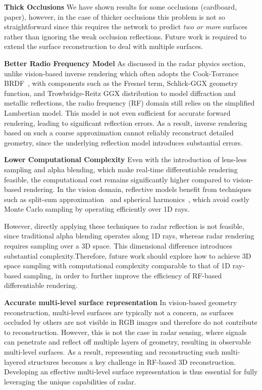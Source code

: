 \noindent \textbf{Thick Occlusions} We have shown results for some occlusions (cardboard, paper), however, in the case of thicker occlusions this problem is not so straightforward since this requires the network to predict \textit{two or more} surfaces rather than ignoring the weak occlusion reflections. Future work is required to extend the surface reconstruction to deal with multiple surfaces.

\noindent \textbf{Better Radio Frequency Model}
As discussed in the radar physics section, unlike vision-based inverse rendering which often adopts the Cook-Torrance BRDF~\cite{cook1982reflectance}, with components such as the Fresnel term, Schlick-GGX geometry function, and Trowbridge-Reitz GGX distribution to model diffraction and metallic reflections, the radio frequency (RF) domain still relies on the simplified Lambertian model.
This model is not even sufficient for accurate forward rendering, leading to significant reflection errors.
As a result, inverse rendering based on such a coarse approximation cannot reliably reconstruct detailed geometry, since the underlying reflection model introduces substantial errors.

\noindent \textbf{Lower Computational Complexity}
Even with the introduction of lens-less sampling and alpha blending, which make real-time differentiable rendering feasible, the computational cost remains significantly higher compared to vision-based rendering.
In the vision domain, reflective models benefit from techniques such as split-sum approximation~\cite{munkberg2022extracting} and spherical harmonics~\cite{verbin2022ref}, which avoid costly Monte Carlo sampling by operating efficiently over 1D rays.

However, directly applying these techniques to radar reflection is not feasible, since traditional alpha blending operates along 1D rays, whereas radar rendering requires sampling over a 3D space.
This dimensional difference introduces substantial complexity.Therefore, future work should explore how to achieve 3D space sampling with computational complexity comparable to that of 1D ray-based sampling, in order to further improve the efficiency of RF-based differentiable rendering.

\noindent \textbf{Accurate multi-level surface representation}
In vision-based geometry reconstruction, multi-level surfaces are typically not a concern, as surfaces occluded by others are not visible in RGB images and therefore do not contribute to reconstruction.
However, this is not the case in radar sensing, where signals can penetrate and reflect off multiple layers of geometry, resulting in observable multi-level surfaces.
As a result, representing and reconstructing such multi-layered structures becomes a key challenge in RF-based 3D reconstruction.
Developing an effective multi-level surface representation is thus essential for fully leveraging the unique capabilities of radar.
